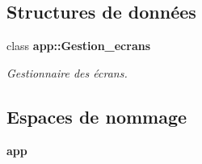 \subsection*{Structures de données}
\begin{DoxyCompactItemize}
\item 
class {\bf app\+::\+Gestion\+\_\+ecrans}
\begin{DoxyCompactList}\small\item\em Gestionnaire des écrans. \end{DoxyCompactList}\end{DoxyCompactItemize}
\subsection*{Espaces de nommage}
\begin{DoxyCompactItemize}
\item 
 {\bf app}
\end{DoxyCompactItemize}
